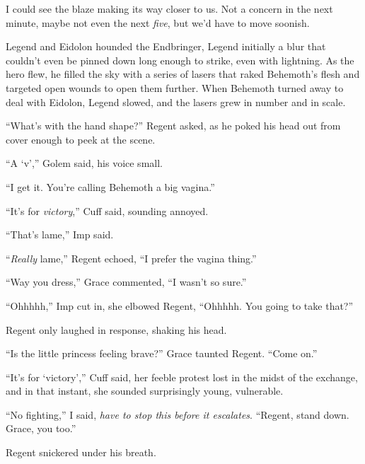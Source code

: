 I could see the blaze making its way closer to us.  Not a concern in the next minute, maybe not even the next \emph{five}, but we'd have to move soonish.



Legend and Eidolon hounded the Endbringer, Legend initially a blur that couldn't even be pinned down long enough to strike, even with lightning.  As the hero flew, he filled the sky with a series of lasers that raked Behemoth's flesh and targeted open wounds to open them further.  When Behemoth turned away to deal with Eidolon, Legend slowed, and the lasers grew in number and in scale.



``What's with the hand shape?'' Regent asked, as he poked his head out from cover enough to peek at the scene.



``A `v','' Golem said, his voice small.



``I get it.  You're calling Behemoth a big vagina.''



``It's for \emph{victory},'' Cuff said, sounding annoyed.



``That's lame,'' Imp said.



``\emph{Really} lame,'' Regent echoed, ``I prefer the vagina thing.''



``Way you dress,'' Grace commented, ``I wasn't so sure.''



``Ohhhhh,'' Imp cut in, she elbowed Regent, ``Ohhhhh.  You going to take that?''



Regent only laughed in response, shaking his head.



``Is the little princess feeling brave?'' Grace taunted Regent.  ``Come on.''



``It's for `victory','' Cuff said, her feeble protest lost in the midst of the exchange, and in that instant, she sounded surprisingly young, vulnerable.



``No fighting,'' I said, \emph{have to stop this before it escalates}.  ``Regent, stand down.  Grace, you too.''



Regent snickered under his breath.



